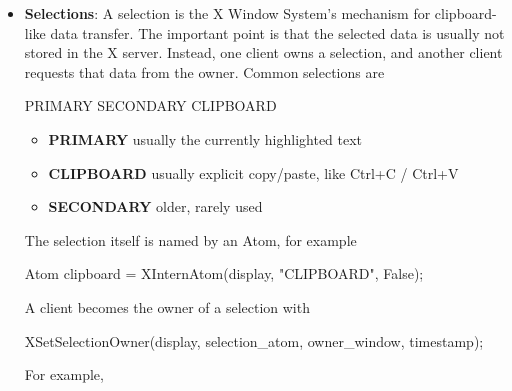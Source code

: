 \documentclass{report}
\begin{document}
\begin{itemize}
\begin{cppcode}
            \end{cppcode}
            \begin{itemize}
                \item \textbf{close\_mode}: close\_mode Specifies the client close-down mode. You can pass \textbf{DestroyAll,} \textbf{RetainPermanent,} or \textbf{RetainTemporary.}
            \end{itemize}
            \bigbreak \noindent 
            The \textbf{XSetCloseDownMode} defines what will happen to the client’s resources at connection close. A connection starts in \textbf{DestroyAll} mode.
            \bigbreak \noindent 
            \textbf{XSetCloseDownMode} can generate a \textbf{BadValue} error.
        \item \textbf{Selections}: A selection is the X Window System’s mechanism for clipboard-like data transfer.
            \bigbreak \noindent 
            The important point is that the selected data is usually not stored in the X server. Instead, one client owns a selection, and another client requests that data from the owner.
            \bigbreak \noindent 
            Common selections are
            \bigbreak \noindent 
            \begin{cppcode}
            PRIMARY
            SECONDARY
            CLIPBOARD
            \end{cppcode}
            \begin{itemize}
                \item \textbf{PRIMARY}    usually the currently highlighted text
                \item \textbf{CLIPBOARD}  usually explicit copy/paste, like Ctrl+C / Ctrl+V
                \item \textbf{SECONDARY}  older, rarely used
            \end{itemize}
            The selection itself is named by an Atom, for example
            \bigbreak \noindent 
            \begin{cppcode}
            Atom clipboard = XInternAtom(display, "CLIPBOARD", False);
            \end{cppcode}
            \bigbreak \noindent 
            A client becomes the owner of a selection with
            \bigbreak \noindent 
            \begin{cppcode}
            XSetSelectionOwner(display, selection_atom, owner_window, timestamp);
            \end{cppcode}
            \bigbreak \noindent 
            For example,
            \bigbreak \noindent 

\end{itemize}
\end{document}
